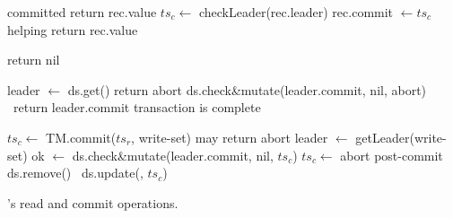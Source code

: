\begin{algorithm}[t]
  \begin{algorithmic}
    \small
		 \Comment committed
     			   \State return rec.value \EndIf
 			\State $ts_c \leftarrow$ {\sc checkLeader}(rec.leader)
   			\State rec.commit $\leftarrow ts_c$ \Comment helping 
 			   \State return  rec.value \EndIf
      		\EndIf
      		


      \EndFor
      \State  return nil
      \EndProcedure

\Statex


      				\State leader $\leftarrow$ ds.get()
     				  return abort  \EndIf 		     	 	
     				    
					\State ds.check\&mutate(leader.commit, nil, abort)
				\Else\ return leader.commit \Comment transaction is complete 
				\EndIf 		     	 	
		     	 \EndWhile
	   	\EndProcedure
\Statex

      
      	\State $ts_c \leftarrow$ TM.commit($ts_r$, write-set) \Comment may return abort
		\State leader  $\leftarrow$ getLeader(write-set)
	      	 \State  ok $\leftarrow$ ds.check\&mutate(leader.commit, nil,  $ts_c$)
   		 $ts_c \leftarrow$ abort \EndIf
	\EndIf
	\State \Comment post-commit
			 ds.remove()  	
			\Else\ ds.update(, $ts_c$)
			\EndIf
	\EndFor
\EndProcedure
      
  \end{algorithmic}
  \caption{\sys's read and commit operations.} 
  \label{fig:get-pseudocode}
\end{algorithm} 




